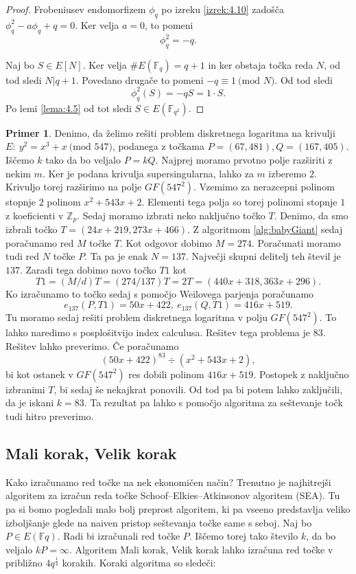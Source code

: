 \documentclass[12pt,a4paper,twoside]{article}
\theoremstyle{definition} %
\newtheorem{primer}[definicija]{Primer}
\theoremstyle{plain} %
\numberwithin{equation}{section}  %
\newcommand{\Z}{\mathbb Z}
\newcommand{\F}{\mathbb F}
\newcommand{\E}[1]{E({#1})}
\newcommand{\MOD}[1]{\ \text{(mod }{#1}\text{)}}
\begin{document}
\begin{proof}

 Frobeniusev endomorfizem $\phi_q$ po izreku \ref{izrek:4.10} zadošča $\phi^2_q-a\phi_q+q=0$. Ker velja $a = 0$, to pomeni
$$\phi^2_q = -q.$$

Naj bo $S \in E[N]$. Ker velja $\#\E{\F_q} = q+1$ in ker obstaja točka reda $N$, od tod sledi $N|q+1$. Povedano drugače to pomeni $-q \equiv 1 \MOD{N}$. Od tod sledi
$$\phi^2_q(S) = -qS = 1\cdot S.$$
Po lemi \ref{lema:4.5} od tot sledi $S \in \E{\F_{q^2}}$. 
\end{proof}

\begin{primer}
Denimo, da želimo rešiti problem diskretnega logaritma na krivulji $E: \ y^2 = x^3+x \MOD{547}$, podanega z točkama $P=(67,481),Q = (167,405)$. Iščemo $k$ tako da bo veljalo $P = kQ$.
Najprej moramo prvotno polje razširiti z nekim $m$. Ker je podana krivulja supersingularna, lahko za $m$ izberemo $2$. Krivuljo torej razširimo na polje $GF(547^2)$. Vzemimo za nerazcepni polinom stopnje $2$ polinom $x^2+543x+2$. Elementi tega polja so torej polinomi stopnje $1$ z koeficienti v $\Z_p$.
Sedaj moramo izbrati neko naključno točko $T$. Denimo, da smo izbrali točko $T = (24x+219,273x+466)$. Z algoritmom \ref{alg:babyGiant} sedaj poračunamo red $M$ točke $T$. Kot odgovor dobimo $M = 274$. Poračunati moramo tudi red $N$ točke $P$. Ta pa je enak $N = 137$. Največji skupni delitelj teh števil je $137$. Zaradi tega dobimo novo točko $T1$ kot 
$$T1 = (M/d) T = (274/137)T = 2T = (440x+318,363x+296).$$
Ko izračunamo to točko sedaj s pomočjo Weilovega parjenja poračunamo
$$e_{137}(P,T1) = 50x+422, \ e_{137}(Q,T1) = 416x+519.$$
Tu moramo sedaj rešiti problem diskretnega logaritma v polju $GF(547^2)$. To lahko naredimo s posplošitvijo index calculusa. Rešitev tega problema je $83$. Rešitev lahko preverimo.
Če poračunamo
$$(50x+422)^{83} \div (x^2+543x+2),$$
bi kot ostanek v $GF(547^2)$ res dobili polinom $416x+519$.
Postopek z naključno izbranimi $T$, bi sedaj še nekajkrat ponovili. Od tod pa bi potem lahko zaključili, da je iskani $k=83$. Ta rezultat pa lahko s pomočjo algoritma za seštevanje točk tudi hitro preverimo.
\end{primer}

\subsection{Mali korak, Velik korak}
Kako izračunamo red točke na nek ekonomičen način? Trenutno je najhitrejši algoritem za izračun reda točke Schoof–Elkies–Atkinsonov algoritem (SEA). Tu pa si bomo pogledali malo bolj preprost algoritem, ki pa vseeno predstavlja veliko izboljšanje glede na naiven pristop seštevanja točke same s seboj.
Naj bo $P \in E(\F{q})$. Radi bi izračunali red točke $P$. Iščemo torej tako število $k$, da bo veljalo $kP = \infty$. Algoritem Mali korak, Velik korak lahko izračuna red točke v približno $4q^{\frac{1}{4}}$ korakih. Koraki algoritma so sledeči:
\end{document}
